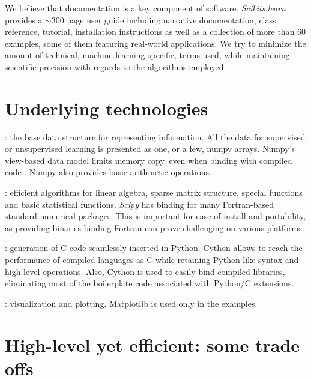 \documentclass[twoside,11pt]{article}
\begin{document}
\smallskip {}
%
We believe that documentation is a key component of software.
\emph{Scikits.learn} provides a $\sim$300 page user guide including
narrative documentation, class reference, tutorial, installation
instructions as well as a collection of more than 60 examples, some of
them featuring real-world applications. We try to minimize the amount of
technical, machine-learning specific, terms used, while maintaining
scientific precision with regards to the algorithms employed.


\section{Underlying technologies}



:
%
the base data structure for representing
information. All the data for supervised or unsupervised learning is
presented as one, or a few, numpy arrays. Numpy's view-based data model
limits memory copy, even when binding with compiled code
\citep{Vanderwalt2011}. Numpy also provides basic arithmetic operations. 

:
%
efficient algorithms for linear algebra, sparse matrix structure, special
functions and basic statistical functions. {\sl Scipy} has binding for
many Fortran-based standard numerical packages. This is important for
ease of install and portability, as providing binaries binding Fortran
can prove challenging on various platforms. 

:
%
generation of C code seamlessly inserted in Python. Cython allows to
reach the performance of compiled languages as C while retaining
Python-like syntax and high-level operations. Also, Cython is used to
easily bind compiled libraries, eliminating most of the boilerplate code
associated with Python/C extensions.

:
%
visualization and plotting. Matplotlib is used only in the examples.

\section{High-level yet efficient: some trade offs}
\end{document}
